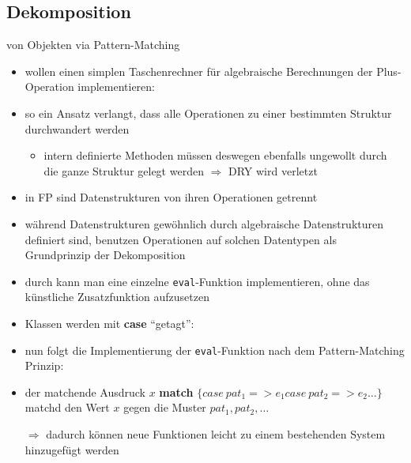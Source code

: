 \subsection{Dekomposition}
von Objekten via Pattern-Matching


\begin{itemize}
  \item wollen einen simplen Taschenrechner für algebraische Berechnungen \und 
  der Plus-Operation implementieren:
  
  
  
  \item so ein Ansatz verlangt, dass alle Operationen zu einer bestimmten
  Struktur durchwandert werden
  
  \begin{itemize}
    \item intern definierte Methoden müssen deswegen ebenfalls ungewollt
    durch die ganze Struktur gelegt werden $\Rightarrow$ DRY wird
    verletzt
  \end{itemize}
\end{itemize}




\begin{itemize}
  \item in FP sind Datenstrukturen von ihren Operationen getrennt  
  \item während Datenstrukturen gewöhnlich durch algebraische Datenstrukturen
  definiert sind, benutzen Operationen auf solchen Datentypen 
   als Grundprinzip der Dekomposition
  \item durch  kann man eine einzelne 
  \texttt{eval}-Funktion implementieren, ohne das künstliche Zusatzfunktion
  aufzusetzen
  \item Klassen werden mit \textbf{case} \enquote{getagt}:
  
  
  \item nun folgt die Implementierung der \texttt{eval}-Funktion nach dem
  Pattern-Matching Prinzip:
  
  
  
  \item der matchende Ausdruck $x$ \textbf{match} $\{ case\: pat_1 => e_1
  case\: pat_2 => e_2 \ldots \}$ matchd den Wert $x$ gegen die Muster $pat_1, 
  pat_2, \ldots$
  
  
  $\Rightarrow$ dadurch können neue Funktionen leicht zu einem bestehenden
  System hinzugefügt werden
\end{itemize}


